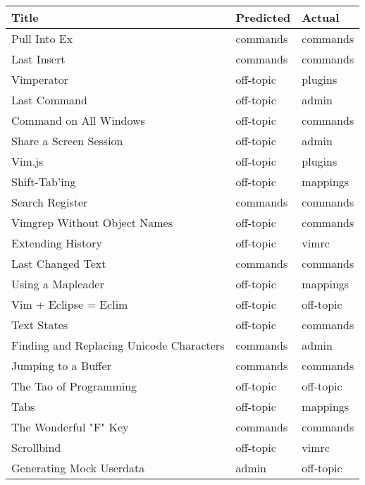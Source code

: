\begin{tabular}{lll}
\hline
 Title                                       & Predicted   & Actual    \\
\hline
 Pull Into Ex                                & commands    & commands  \\
 Last Insert                                 & commands    & commands  \\
 Vimperator                                  & off-topic   & plugins   \\
 Last Command                                & off-topic   & admin     \\
 Command on All Windows                      & off-topic   & commands  \\
 Share a Screen Session                      & off-topic   & admin     \\
 Vim.js                                      & off-topic   & plugins   \\
 Shift-Tab'ing                               & off-topic   & mappings  \\
 Search Register                             & commands    & commands  \\
 Vimgrep Without Object Names                & off-topic   & commands  \\
 Extending History                           & off-topic   & vimrc     \\
 Last Changed Text                           & commands    & commands  \\
 Using a Mapleader                           & off-topic   & mappings  \\
 Vim + Eclipse = Eclim                       & off-topic   & off-topic \\
 Text States                                 & off-topic   & commands  \\
 Finding and Replacing Unicode Characters    & commands    & admin     \\
 Jumping to a Buffer                         & commands    & commands  \\
 The Tao of Programming                      & off-topic   & off-topic \\
 Tabs                                        & off-topic   & mappings  \\
 The Wonderful "F" Key                       & commands    & commands  \\
 Scrollbind                                  & off-topic   & vimrc     \\
 Generating Mock Userdata                    & admin       & off-topic \\

\end{tabular}
